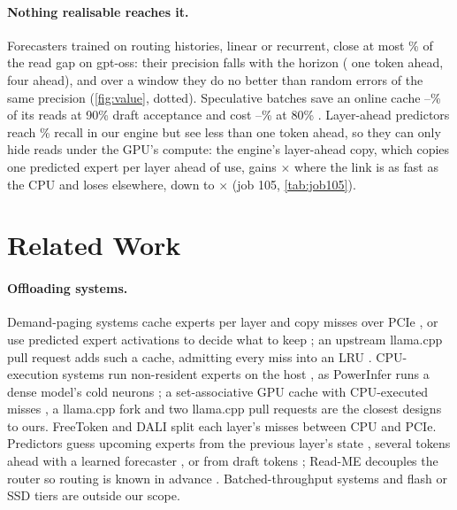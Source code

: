 \paragraph{Nothing realisable reaches it.} Forecasters trained on routing histories, linear or recurrent, close at most
\lfShareMaxGpt\% of the read gap on gpt-oss: their precision falls with the horizon (\lfPrecOneGpt{} one token ahead,
\lfPrecFourGpt{} four ahead), and over a window they do no better than random errors of the same precision
(\cref{fig:value}, dotted). Speculative batches save an online cache \bkSameNineMin--\bkSameNineMax\% of its reads at
90\% draft acceptance and cost \bkSameEightLossMin--\bkSameEightLossMax\% at 80\% \citep{spmoe,moespac2026,cascade2025}.
Layer-ahead predictors \citep{hwang2024pregated,zhu2025preattention} reach \laRecallK\% recall in our engine but see less
than one token ahead, so they can only hide reads under the GPU's compute: the engine's layer-ahead copy, which copies
one predicted expert per layer ahead of use, gains \jgPfLowFastMin$\times$ where the link is as fast as the CPU and
loses elsewhere, down to \jgPfLowMin$\times$ (job 105, \cref{tab:job105}).

\section{Related Work}\label{sec:related}
\paragraph{Offloading systems.} Demand-paging systems cache experts per layer and copy misses over
PCIe \citep{eliseev2023offloading,xue2024moeinfinity,song2024promoe,tang2024hobbit,swapmoe2024,adapmoe2024,edgemoe2023,expertflow,pagingexperts2026},
or use predicted expert activations to decide what to keep \citep{sida2024}; an upstream
llama.cpp pull request adds such a cache, admitting every miss into an LRU \citep{llamacpppr29887}. CPU-execution
systems run non-resident experts on the host \citep{kamahori2024fiddler,ktransformers,zhong2025hybrimoe,daop2025,wang2026cloudgrade,atsinfer2026},
as PowerInfer runs a dense model's cold neurons \citep{powerinfer2024};
a set-associative GPU cache with CPU-executed misses \citep{huang2025cpugpu}, a llama.cpp fork \citep{leloch2026,llamacppdisc24528}
and two llama.cpp pull requests \citep{llamacpppr26563,llamacpppr27861} are the closest designs to ours.
FreeToken \citep{freetoken} and DALI \citep{dali2026} split each layer's misses between CPU and PCIe. Predictors guess
upcoming experts from the previous layer's state \citep{hwang2024pregated,zhu2025preattention}, several tokens ahead
with a learned forecaster \citep{wang2026seqmoe,mira2026}, or from draft tokens \citep{spmoe,moespac2026,cascade2025};
Read-ME decouples the router so routing is known in advance \citep{readme2024}. Batched-throughput
systems \citep{flexgen2023,cao2024moelightning,yuan2025moelens} and flash or SSD tiers \citep{llminflash2024,ssdllama,edgezero} are outside our
scope.


